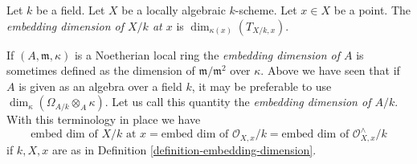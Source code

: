 \begin{definition}
\label{definition-embedding-dimension}
Let $k$ be a field. Let $X$ be a locally algebraic $k$-scheme.
Let $x \in X$ be a point. The {\it embedding dimension of $X/k$ at $x$}
is $\dim_{\kappa(x)}(T_{X/k, x})$.
\end{definition}

\noindent
If $(A, \mathfrak m, \kappa)$ is a Noetherian local ring
the {\it embedding dimension of $A$} is sometimes defined as the dimension of
$\mathfrak m/\mathfrak m^2$ over $\kappa$. Above we have seen that
if $A$ is given as an algebra over a field $k$, it may be preferable
to use $\dim_\kappa(\Omega_{A/k} \otimes_A \kappa)$. Let
us call this quantity the {\it embedding dimension of $A/k$}.
With this terminology in place we have
$$
\text{embed dim of }X/k\text{ at }x =
\text{embed dim of }\mathcal{O}_{X, x}/k =
\text{embed dim of }\mathcal{O}_{X, x}^\wedge/k
$$
if $k, X, x$ are as in Definition \ref{definition-embedding-dimension}.











